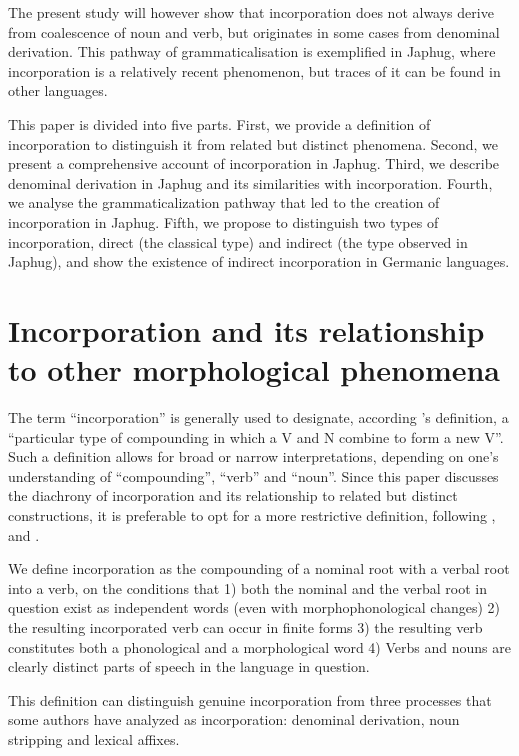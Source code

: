 \documentclass[oldfontcommands,oneside,a4paper,11pt]{article}
\begin{document}
The present study will however show that incorporation does not always derive from coalescence of noun and verb, but originates in some cases from denominal derivation. This pathway of grammaticalisation is exemplified in Japhug, where incorporation is a relatively recent phenomenon, but traces of it can be found in other languages.

This paper is divided into five parts. First, we provide a definition of incorporation to distinguish it from related but distinct phenomena. Second, we present a comprehensive account of incorporation in Japhug. Third,  we describe denominal derivation in Japhug and its similarities with incorporation.  Fourth, we analyse the grammaticalization pathway that led to the creation of incorporation in Japhug. Fifth, we propose to distinguish two types of incorporation, direct (the classical type) and indirect (the type observed in Japhug), and show the existence of indirect incorporation in Germanic languages.

 




\section{Incorporation and its relationship to other morphological phenomena} \label{sec:definition}
The term ``incorporation'' is generally used to designate, according \citet[848]{mithun84incorp}'s definition, a ``particular type of compounding in which a V and N combine to form a new V''. Such a definition allows for broad or narrow interpretations, depending on one's understanding of ``compounding'', ``verb'' and ``noun''. Since this paper discusses the diachrony of incorporation and its relationship to related but distinct constructions, it is preferable to opt for a more restrictive definition, following  \citet{sapir11incorp}, \citet{gerds98incorporation} and \citet[169]{mattissen01nivkh}. 



We define incorporation as the compounding of a nominal root with a verbal root into a verb, on the conditions that 1) both the nominal and the verbal root in question exist as  independent words    (even with morphophonological changes) 2) the resulting incorporated verb can occur in   finite forms 3) the resulting verb constitutes both a phonological and a morphological word 4)  Verbs and nouns are clearly distinct parts of speech in the language in question.

This definition can distinguish genuine incorporation  from three processes that some authors have analyzed as incorporation: denominal derivation, noun stripping and lexical affixes. 
\end{document}

